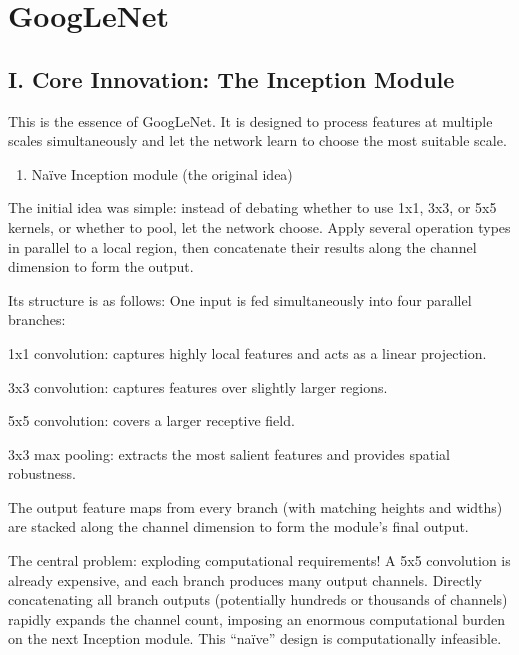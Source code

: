 \setcounter{section}{2}

\hypertarget{googlenet}{%
\section{GoogLeNet}\label{googlenet}}

\hypertarget{i.-core-innovation-the-inception-module}{%
\subsection{I. Core Innovation: The Inception Module}\label{i.-core-innovation-the-inception-module}}

This is the essence of GoogLeNet. It is designed to process features at multiple scales simultaneously and let the network learn to choose the most suitable scale.

\begin{enumerate}
\def\labelenumi{\arabic{enumi}.}
\tightlist
\item
  Naïve Inception module (the original idea)
\end{enumerate}

The initial idea was simple: instead of debating whether to use 1x1, 3x3, or 5x5 kernels, or whether to pool, let the network choose. Apply several operation types in parallel to a local region, then concatenate their results along the channel dimension to form the output.

Its structure is as follows:
One input is fed simultaneously into four parallel branches:

1x1 convolution: captures highly local features and acts as a linear projection.

3x3 convolution: captures features over slightly larger regions.

5x5 convolution: covers a larger receptive field.

3x3 max pooling: extracts the most salient features and provides spatial robustness.

The output feature maps from every branch (with matching heights and widths) are stacked along the channel dimension to form the module's final output.

The central problem: exploding computational requirements!
A 5x5 convolution is already expensive, and each branch produces many output channels. Directly concatenating all branch outputs (potentially hundreds or thousands of channels) rapidly expands the channel count, imposing an enormous computational burden on the next Inception module. This ``naïve'' design is computationally infeasible.

